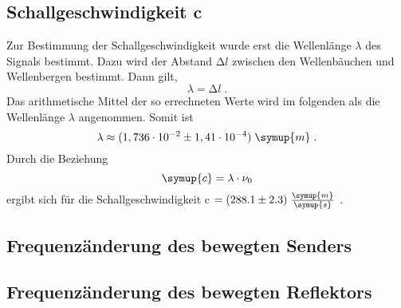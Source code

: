 \subsection{Schallgeschwindigkeit c}
Zur Bestimmung der Schallgeschwindigkeit wurde erst die Wellenlänge $\lambda$ des Signals
bestimmt. Dazu wird der Abstand $\increment l$ zwischen den Wellenbäuchen und Wellenbergen
bestimmt. Dann gilt,
\begin{equation*}
  \lambda = \increment l \;.
\end{equation*}
Das arithmetische Mittel der so errechneten Werte wird im folgenden als die
Wellenlänge $\lambda$ angenommen. Somit ist
\begin{equation*}
  \lambda \approx (1,736\cdot 10^{-2} \pm 1,41\cdot10^{-4})\;\symup{m}\; .
\end{equation*}
Durch die Beziehung
\begin{equation*}
  \symup{c} = \lambda \cdot \nu_0
\end{equation*}
ergibt sich für die Schallgeschwindigkeit c $ = (288.1 \pm 2.3)\;
 \frac{\symup{m}}{\symup{s}}$ .
\subsection{Frequenzänderung des bewegten Senders}

\subsection{Frequenzänderung des bewegten Reflektors}




























%
